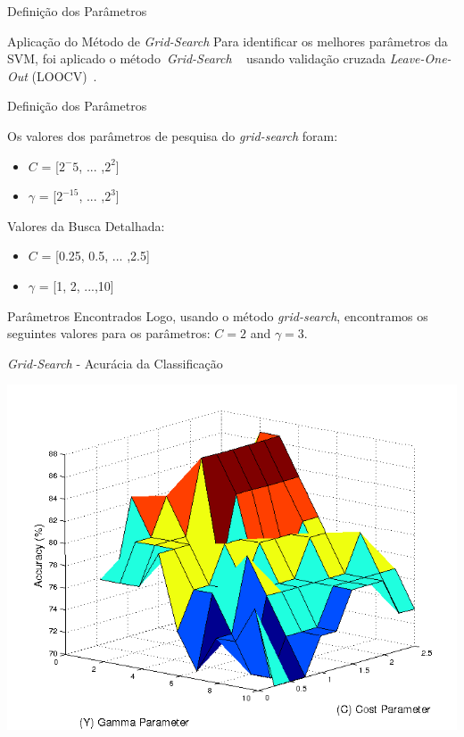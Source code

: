 \documentclass{beamer}
\begin{document}
\begin{frame}{Definição dos Parâmetros}
 \begin{block}{Aplicação do Método de \textit{Grid-Search}}
 Para identificar os melhores parâmetros da SVM, foi aplicado o método~\textit{Grid-Search} ~\cite{gridsearchsvm2010} usando validação cruzada \textit{Leave-One-Out} (LOOCV)~\cite{kantardzic2011data}.   
 \end{block}
\end{frame}

\begin{frame}{Definição dos Parâmetros}
 \begin{block}{}
 Os valores dos parâmetros de pesquisa do \textit{grid-search} foram:
 \begin{itemize}
  \item $C$ = [$2^-5$, ... ,$2^2$]
  \item $\gamma$ = [$2^{-15}$, ... ,$2^3$]
 \end{itemize}

 Valores da Busca Detalhada:
  \begin{itemize}
   \item $C$ = [0.25, 0.5, ... ,2.5]
   \item $\gamma$ = [1, 2, ...,10]
  \end{itemize}
 \end{block}
 
 \begin{block}{Parâmetros Encontrados}
  Logo, usando o método \textit{grid-search}, encontramos os seguintes valores para os parâmetros: $C = 2$ and $\gamma = 3$.
 \end{block}
\end{frame}

\begin{frame}{\textit{Grid-Search} - Acurácia da Classificação}
  \begin{block}{}
  \center  
      \includegraphics[scale=0.4]{./img/gridsearch.png}      
  \end{block}
\end{frame}
\end{document}
